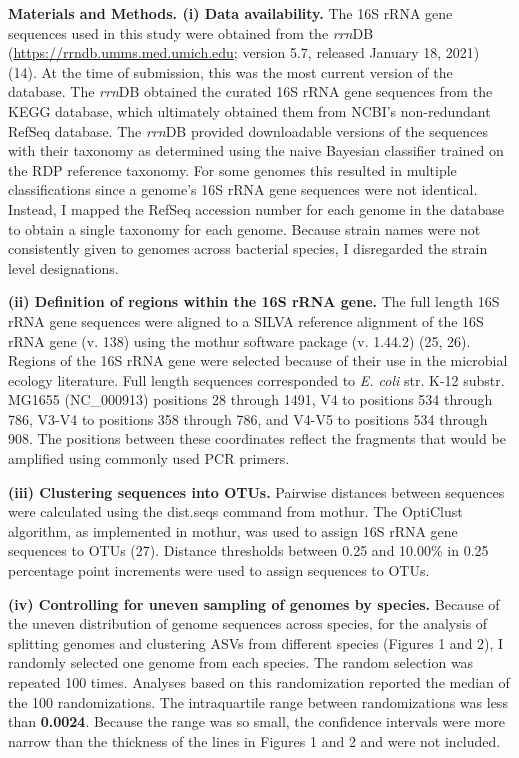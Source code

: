 \documentclass[
]{article}
\begin{document}
\vspace{20mm}

\textbf{Materials and Methods. (i) Data availability.} The 16S rRNA gene
sequences used in this study were obtained from the \emph{rrn}DB
(\url{https://rrndb.umms.med.umich.edu}; version 5.7, released January
18, 2021) (14). At the time of submission, this was the most current
version of the database. The \emph{rrn}DB obtained the curated 16S rRNA
gene sequences from the KEGG database, which ultimately obtained them
from NCBI's non-redundant RefSeq database. The \emph{rrn}DB provided
downloadable versions of the sequences with their taxonomy as determined
using the naive Bayesian classifier trained on the RDP reference
taxonomy. For some genomes this resulted in multiple classifications
since a genome's 16S rRNA gene sequences were not identical. Instead, I
mapped the RefSeq accession number for each genome in the database to
obtain a single taxonomy for each genome. Because strain names were not
consistently given to genomes across bacterial species, I disregarded
the strain level designations.

\textbf{(ii) Definition of regions within the 16S rRNA gene.} The full
length 16S rRNA gene sequences were aligned to a SILVA reference
alignment of the 16S rRNA gene (v. 138) using the mothur software
package (v. 1.44.2) (25, 26). Regions of the 16S rRNA gene were selected
because of their use in the microbial ecology literature. Full length
sequences corresponded to \emph{E. coli} str. K-12 substr. MG1655
(NC\_000913) positions 28 through 1491, V4 to positions 534 through 786,
V3-V4 to positions 358 through 786, and V4-V5 to positions 534 through
908. The positions between these coordinates reflect the fragments that
would be amplified using commonly used PCR primers.

\textbf{(iii) Clustering sequences into OTUs.} Pairwise distances
between sequences were calculated using the dist.seqs command from
mothur. The OptiClust algorithm, as implemented in mothur, was used to
assign 16S rRNA gene sequences to OTUs (27). Distance thresholds between
0.25 and 10.00\% in 0.25 percentage point increments were used to assign
sequences to OTUs.

\textbf{(iv) Controlling for uneven sampling of genomes by species.}
Because of the uneven distribution of genome sequences across species,
for the analysis of splitting genomes and clustering ASVs from different
species (Figures 1 and 2), I randomly selected one genome from each
species. The random selection was repeated 100 times. Analyses based on
this randomization reported the median of the 100 randomizations. The
intraquartile range between randomizations was less than
\textbf{0.0024}. Because the range was so small, the confidence
intervals were more narrow than the thickness of the lines in Figures 1
and 2 and were not included.
\end{document}
